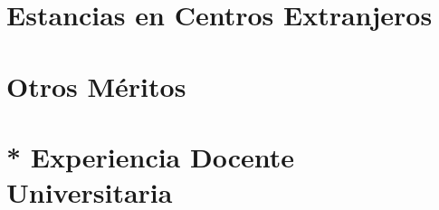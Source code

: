 \documentclass[9pt]{article}
\begin{document}
\begin{comment}
\section*{Patentes y Modelos de Utilidad}

\end{comment}

\section*{Estancias en Centros Extranjeros}


\begin{comment}
\section*{Tesis Doctorales Dirigidas}

\addcontentsline{toc}{chapter}{Tesis Doctorales Dirigidas}
\end{comment}

\section*{Otros Méritos}
\section*{* Experiencia Docente Universitaria}


\renewcommand{\refname}{* Proyectos Fin de Carrera Dirigidos}


\renewcommand{\refname}{* Cursos Impartidos}


\label{end}
\end{document}
